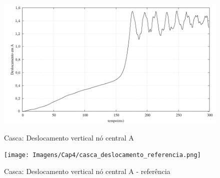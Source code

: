 \begin{figure}[!htbp]
	\caption{Casca: Deslocamento vertical nó central A}
	\centering
	{\includegraphics[scale=.6, trim=0cm 0cm 0cm 0cm, clip=true]{Imagens/Cap4/casca_deslocamentoA.pdf}}
	\label{fig:casca_deslocamentoA}
\end{figure}

\begin{figure}[!htbp]
	\caption{Casca: Deslocamento vertical nó central A - referência}
	\centering
	{\texttt{[image: Imagens/Cap4/casca\_deslocamento\_referencia.png]}}
	\label{fig:casca_deslocamento_ref}
\end{figure}

